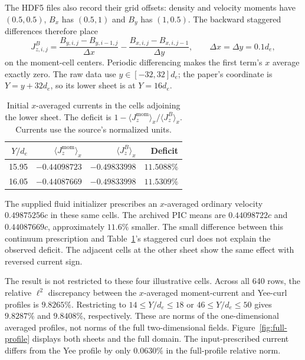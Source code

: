 The HDF5 files also record their grid offsets: density and velocity moments
have $(0.5,0.5)$, $B_x$ has $(0.5,1)$ and $B_y$ has $(1,0.5)$.
The backward staggered differences therefore place
\begin{equation}
 J_{z,i,j}^{B}=
 \frac{B_{y,i,j}-B_{y,i-1,j}}{\Delta x}
 -\frac{B_{x,i,j}-B_{x,i,j-1}}{\Delta y},\qquad
 \Delta x=\Delta y=0.1d_e,
 \label{eq:archived-magnetic-curl}
\end{equation}
on the moment-cell centers. Periodic differencing makes the first term's
$x$ average exactly zero. The raw data use $y\in[-32,32]d_e$; the paper's
coordinate is $Y=y+32d_e$, so its lower sheet is at $Y=16d_e$.

\begin{table}[htbp]
\centering
\caption{Initial $x$-averaged currents in the cells adjoining the lower sheet.
The deficit is $1-\langle J_z^{\mathrm{mom}}\rangle_x/
\langle J_z^B\rangle_x$. Currents use the source's normalized units.}
\label{tab:initial-current}
\begin{tabular}{rrrr}
\toprule
$Y/d_e$ & $\langle J_z^{\mathrm{mom}}\rangle_x$ &
$\langle J_z^B\rangle_x$ & Deficit \\
\midrule
15.95 & $-0.44098723$ & $-0.49833998$ & $11.5088\%$ \\
16.05 & $-0.44087669$ & $-0.49833998$ & $11.5309\%$ \\
\bottomrule
\end{tabular}
\end{table}

The supplied fluid initializer prescribes an $x$-averaged ordinary velocity
$0.49875256c$ in these same cells. The archived PIC means are
$0.44098722c$ and $0.44087669c$, approximately $11.6\%$ smaller. The small
difference between this continuum prescription and Table~\ref{tab:initial-current}'s
staggered curl does not explain the observed deficit. The adjacent cells at
the other sheet show the same effect with reversed current sign.

The result is not restricted to these four illustrative cells.
Across all 640 rows, the relative $\ell^2$ discrepancy between the
$x$-averaged moment-current and Yee-curl profiles is $9.8265\%$.
Restricting to $14\leq Y/d_e\leq18$ or $46\leq Y/d_e\leq50$ gives
$9.8287\%$ and $9.8408\%$, respectively. These are norms of the
one-dimensional averaged profiles, not norms of the full two-dimensional
fields. Figure~\ref{fig:full-profile} displays both sheets and the full domain.
The input-prescribed current differs from the Yee profile by only $0.0630\%$
in the full-profile relative norm.

